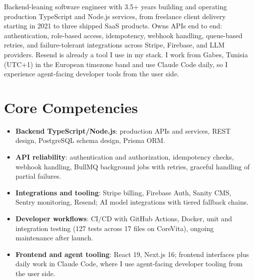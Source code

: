 \documentclass[11pt,a4paper,sans]{moderncv}
\begin{document}
\makecvtitle

\vspace{6pt}
\small{Backend-leaning software engineer with 3.5+ years building and operating production TypeScript and Node.js services, from freelance client delivery starting in 2021 to three shipped SaaS products. Owns APIs end to end: authentication, role-based access, idempotency, webhook handling, queue-based retries, and failure-tolerant integrations across Stripe, Firebase, and LLM providers. Resend is already a tool I use in my stack. I work from Gabes, Tunisia (UTC+1) in the European timezone band and use Claude Code daily, so I experience agent-facing developer tools from the user side.}

\section{Core Competencies}
\vspace{1pt}
\begin{itemize}
\item \textbf{Backend TypeScript/Node.js}: production APIs and services, REST design, PostgreSQL schema design, Prisma ORM.
\item \textbf{API reliability}: authentication and authorization, idempotency checks, webhook handling, BullMQ background jobs with retries, graceful handling of partial failures.
\item \textbf{Integrations and tooling}: Stripe billing, Firebase Auth, Sanity CMS, Sentry monitoring, Resend; AI model integrations with tiered fallback chains.
\item \textbf{Developer workflows}: CI/CD with GitHub Actions, Docker, unit and integration testing (127 tests across 17 files on CoreVita), ongoing maintenance after launch.
\item \textbf{Frontend and agent tooling}: React 19, Next.js 16; frontend interfaces plus daily work in Claude Code, where I use agent-facing developer tooling from the user side.
\end{itemize}
\end{document}
